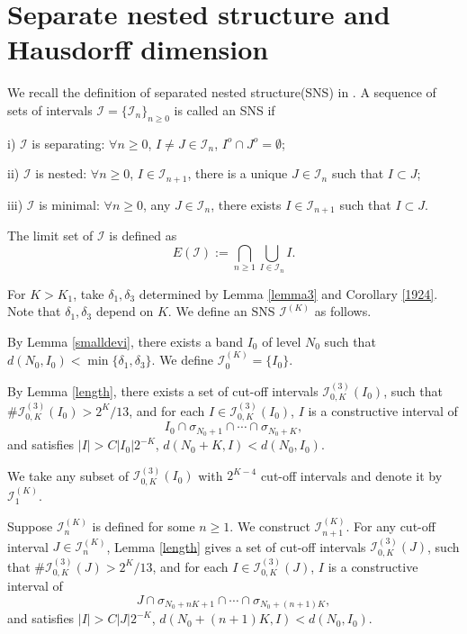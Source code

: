 \documentclass{amsart}
\theoremstyle{definition}
\begin{document}
\section{Separate nested structure and Hausdorff dimension}


We recall the definition of separated nested structure(SNS) in \cite{LQY22}.
A sequence of sets of intervals 
$\mathcal{I}=\{\mathcal{I}_n\}_{n\ge0}$ is called an SNS if

i) $\mathcal{I}$ is separating: $\forall n\ge0$, 
$I\ne J\in\mathcal{I}_n$, $I^o\cap J^o=\emptyset$; 

ii) $\mathcal{I}$ is nested: $\forall n\ge0$, $I\in \mathcal{I}_{n+1}$,
there is a unique $J\in\mathcal{I}_n$ such that $I\subset J$;

iii) $\mathcal{I}$ is minimal: $\forall n\ge0$, any $J\in \mathcal{I}_{n}$,
there exists $I\in\mathcal{I}_{n+1}$ such that $I\subset J$.

The limit set of $\mathcal{I}$ is defined as
$$E(\mathcal{I}):=\bigcap_{n\ge1}\bigcup_{I\in \mathcal{I}_n}I.$$

For $K>K_1$, take $\delta_1,\delta_3$ 
determined by Lemma \ref{lemma3} and Corollary \ref{1924}.
Note that $\delta_1,\delta_3$ depend on $K$.
We define an SNS $\mathcal{I}^{(K)}$ as follows.

By Lemma \ref{smalldevi}, there exists a band $I_0$ of level $N_0$ such that
$d(N_0,I_0)<\min\{\delta_1,\delta_3\}$.
We define $\mathcal{I}_0^{(K)}=\{I_0\}$.


By Lemma \ref{length},
there exists a set of cut-off intervals $\mathcal{I}_{0,K}^{(3)}(I_0)$,
such that $\#\mathcal{I}_{0,K}^{(3)}(I_0)>2^{K}/13$, 
and for each $I\in \mathcal{I}_{0,K}^{(3)}(I_0)$,
$I$ is a constructive interval of 
$$I_0\cap\sigma_{N_0+1}\cap\cdots\cap \sigma_{N_0+K},$$ 
and satisfies $|I|>C|I_0|2^{-K}$, $d(N_0+K,I)<d(N_0,I_0)$.

We take any subset of $\mathcal{I}_{0,K}^{(3)}(I_0)$ with $2^{K-4}$ cut-off intervals
and denote it by $\mathcal{I}_1^{(K)}$.

Suppose $\mathcal{I}_n^{(K)}$ is defined for some $n\ge1$.
We construct $\mathcal{I}_{n+1}^{(K)}$.
For any cut-off interval $J\in\mathcal{I}_n^{(K)}$,
 Lemma \ref{length} gives a set of cut-off intervals $\mathcal{I}_{0,K}^{(3)}(J)$,
such that $\#\mathcal{I}_{0,K}^{(3)}(J)>2^{K}/13$, 
and for each $I\in \mathcal{I}_{0,K}^{(3)}(J)$,
$I$ is a constructive interval of 
$$J\cap\sigma_{N_0+nK+1}\cap\cdots\cap \sigma_{N_0+(n+1)K},$$ 
and satisfies $|I|>C|J|2^{-K}$, $d(N_0+(n+1)K,I)<d(N_0,I_0)$.
\end{document}
